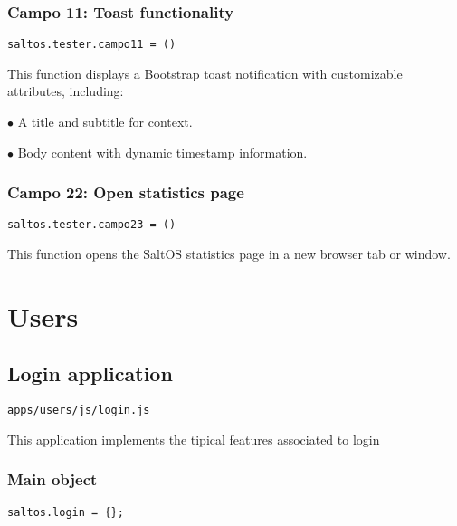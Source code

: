 \documentclass[a4paper]{article}
\begin{document}
\hypertarget{toc162}{}
\subsubsection{Campo 11: Toast functionality}

\begin{lstlisting}
saltos.tester.campo11 = ()
\end{lstlisting}

This function displays a Bootstrap toast notification with customizable attributes, including:

\begin{compactitem}
\item[\color{myblue}$\bullet$] A title and subtitle for context.
\item[\color{myblue}$\bullet$] Body content with dynamic timestamp information.
\end{compactitem}

\hypertarget{toc163}{}
\subsubsection{Campo 22: Open statistics page}

\begin{lstlisting}
saltos.tester.campo23 = ()
\end{lstlisting}

This function opens the SaltOS statistics page in a new browser tab or window.


\hypertarget{toc164}{}
\section{Users}

\hypertarget{toc165}{}
\subsection{Login application}

\begin{lstlisting}
apps/users/js/login.js
\end{lstlisting}

This application implements the tipical features associated to login

\hypertarget{toc166}{}
\subsubsection{Main object}

\begin{lstlisting}
saltos.login = {};
\end{lstlisting}
\end{document}
